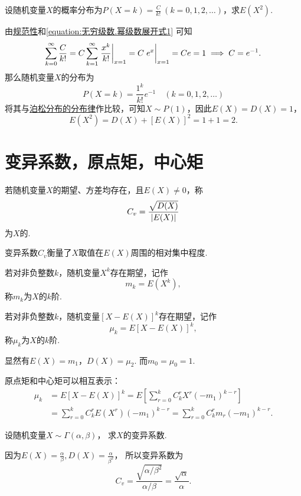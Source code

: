 \begin{example}
设随机变量\(X\)的概率分布为\(P(X=k) = \frac{C}{k!}\ (k=0,1,2,\dotsc)\)，求\(E(X^2)\).
\begin{solution}
由\hyperref[theorem:随机变量及其分布.离散型随机变量的密度函数的性质]{规范性}和\cref{equation:无穷级数.幂级数展开式1} 可知\[
\sum_{k=0}^\infty \frac{C}{k!}
= C \sum_{k=1}^\infty \eval{\frac{x^k}{k!}}_{x=1}
= C \eval{e^x}_{x=1}
= C e = 1
\implies
C = e^{-1}.
\]那么随机变量\(X\)的分布为\[
P(X=k) = \frac{1^k}{k!} e^{-1} \quad(k=0,1,2,\dotsc)
\]将其与\hyperref[equation:随机变量及其分布.泊松分布的分布律]{泊松分布的分布律}作比较，可知\(X \sim P(1)\)，因此\(E(X) = D(X) = 1\)，\[
E(X^2) = D(X) + [E(X)]^2 = 1 + 1 = 2.
\]
\end{solution}
\end{example}

\section{变异系数，原点矩，中心矩}
\begin{definition}
若随机变量\(X\)的期望、方差均存在，且\(E(X) \neq 0\)，称\[
C_v = \frac{\sqrt{D(X)}}{\abs{E(X)}}
\]为\(X\)的.
\end{definition}
变异系数\(C_v\)衡量了\(X\)取值在\(E(X)\)周围的相对集中程度.

\begin{definition}
若对非负整数\(k\)，随机变量\(X^k\)存在期望，记作\[
m_k = E(X^k),
\]称\(m_k\)为\(X\)的\(k\)阶.
\end{definition}

\begin{definition}
若对非负整数\(k\)，随机变量\([X-E(X)]^k\)存在期望，记作\[
\mu_k = E[X-E(X)]^k,
\]称\(\mu_k\)为\(X\)的\(k\)阶.
\end{definition}

显然有\(E(X) = m_1\)，\(D(X) = \mu_2\).
而\(m_0 = \mu_0 = 1\).

原点矩和中心矩可以相互表示：
\begin{align*}
	\mu_k &= E[X-E(X)]^k
	= E\left[ \sum_{r=0}^k{C_k^r X^r (-m_1)^{k-r}} \right] \\
	&= \sum_{r=0}^k{C_k^r E(X^r) (-m_1)^{k-r}}
	= \sum_{r=0}^k{C_k^r m_r (-m_1)^{k-r}}.
\end{align*}

\begin{example}
设随机变量\(X \sim \Gamma(\alpha,\beta)\)，
求\(X\)的变异系数.
\begin{solution}
因为\(E(X)=\frac\alpha\beta,
D(X)=\frac{\alpha}{\beta^2}\)，
所以变异系数为\[
	C_v = \frac{\sqrt{\alpha/\beta^2}}{\alpha/\beta}
	= \frac{\sqrt{\alpha}}{\alpha}.
\]
\end{solution}
\end{example}

